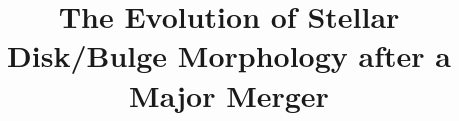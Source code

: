 \documentclass[linenumbers,trackchanges]{aastex7}
\begin{document}
\title{The Evolution of Stellar Disk/Bulge Morphology after a Major Merger}

\end{document}
